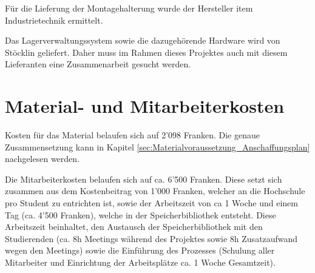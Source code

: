 Für die Lieferung der Montagehalterung wurde der Hersteller item Industrietechnik ermittelt.

Das Lagerverwaltungssystem sowie die dazugehörende Hardware wird von Stöcklin geliefert. Daher muss im Rahmen dieses Projektes auch mit diesem Lieferanten eine Zusammenarbeit gesucht werden.

\section{Material- und Mitarbeiterkosten}
Kosten für das Material belaufen sich auf 2'098 Franken. Die genaue Zusammensetzung kann in Kapitel \ref{sec:Materialvoraussetzung_Anschaffungsplan} nachgelesen werden.

Die Mitarbeiterkosten belaufen sich auf ca. 6'500 Franken. Diese setzt sich zusammen aus dem Kostenbeitrag von 1'000 Franken, welcher an die Hochschule pro Student zu entrichten ist, sowie der Arbeitszeit von ca 1 Woche und einem Tag (ca. 4'500 Franken), welche in der Speicherbibliothek entsteht. Diese Arbeitszeit beinhaltet, den Austausch der Speicherbibliothek mit den Studierenden (ca. 8h Meetings während des Projektes sowie 8h Zusatzaufwand wegen den Meetings) sowie die Einführung des Prozesses (Schulung aller Mitarbeiter und Einrichtung der Arbeitsplätze ca. 1 Woche Gesamtzeit).